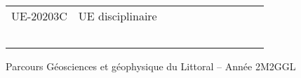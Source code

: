 \documentclass[a4paper,11pt]{article}
\begin{document}
{{\begin{tabular}{lllllllllll}
\rowcolor[HTML]{C0C0C0} 
UE-20203C                      & UE disciplinaire                                   &                           &                           &                           &                                    &                             &                             &                                    &                                  &                                  \\
                               &                                                    &                           &                           &                           &                                    &                             &                             &                                    &                                  &                                  \\
                               &                                                    &                           &                           &                           &                                    &                             &                             &                                    &                                  &                                  \\
                               &                                                    &                           &                           &                           &                                    &                             &                             &                                    &                                  &                                  \\
                               &                                                    &                           &                           &                           &                                    &                             &                             &                                    &                                  &                                  \\
                               &                                                    &                           &                           &                           &                                    &                             &                             &                                    &                                  &                                 
\end{tabular}
}
}{Parcours Géosciences et géophysique du Littoral -- Année 2}{M2GGL}
\end{document}
